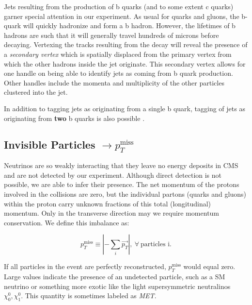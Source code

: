Jets resulting from the production of b quarks (and to some extent c quarks) garner special attention in our experiment. As usual for quarks and gluons, the b-quark will quickly hadronize and form a b hadron. However, the lifetimes of b hadrons are such that it will generally travel hundreds of microns before decaying. Vertexing the tracks resulting from the decay will reveal the presence of a \textit{secondary vertex} which is spatially displaced from the primary vertex from which the other hadrons inside the jet originate. This secondary vertex allows for one handle on being able to identify jets as coming from b quark production. Other handles include the momenta and multiplicity of the other particles clustered into the jet.

In addition to tagging jets as originating from a single b quark, tagging of jets as originating from \textbf{two} b quarks is also possible \cite{bbtagger}.

\subsection{Invisible Particles $\rightarrow p_{T}^{\mathrm{miss}}$}

Neutrinos are so weakly interacting that they leave no energy deposits in CMS and are not detected by our experiment. Although direct detection is not possible, we are able to infer their presence. The net momentum of the protons involved in the collisions are zero, but the individual partons (quarks and gluons) within the proton carry unknown fractions of this total (longitudinal) momentum. Only in the transverse direction may we require momentum conservation. We define this imbalance as:

\begin{equation}
p_{T}^{\mathrm{miss}}  \equiv \left | - \sum_{i} \vec{p_{T}} \right |,~\forall~\textrm{particles~i}.
\end{equation}

If all particles in the event are perfectly reconstructed, $p_{T}^{\mathrm{miss}}$ would equal zero. Large values indicate the presence of an undetected particle, such as a SM neutrino or something more exotic like the light supersymmetric neutralinos $\chi^{0}_{0}, \chi^{0}_{1}$. This quantity is sometimes labeled as \textit{MET}.